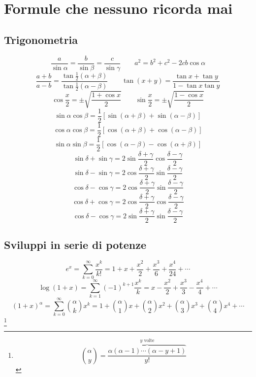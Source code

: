 \chapter{Formule che nessuno ricorda mai}
\section{Trigonometria}
\[\frac{a}{\sin\alpha}=\frac{b}{\sin\beta}=\frac{c}{\sin\gamma}\qquad a^2=b^2+c^2-2cb\cos\alpha\]
\[\frac{a+b}{a-b}=\frac{\tan\frac{1}{2}\left(\alpha+\beta\right)}{\tan\frac{1}{2}\left(\alpha-\beta\right)}\qquad\tan(x+y)=\frac{\tan x+\tan y}{1-\tan x\tan y}\]
\[\cos\frac{x}{2}=\pm\sqrt{\frac{1+\cos x}{2}}\qquad\sin\frac{x}{2}=\pm\sqrt{\frac{1-\cos x}{2}}\]
\[\sin\alpha\cos\beta=\frac{1}{2}\left[\sin\left(\alpha+\beta\right)+\sin\left(\alpha-\beta\right)\right]\]
\[\cos\alpha\cos\beta=\frac{1}{2}\left[\cos\left(\alpha+\beta\right)+\cos\left(\alpha-\beta\right)\right]\]
\[\sin\alpha\sin\beta=\frac{1}{2}\left[\cos\left(\alpha-\beta\right)-\cos\left(\alpha+\beta\right)\right]\]
\[\sin\delta+\sin\gamma=2\sin\frac{\delta+\gamma}{2}\cos\frac{\delta-\gamma}{2}\]
\[\sin\delta-\sin\gamma=2\cos\frac{\delta+\gamma}{2}\sin\frac{\delta-\gamma}{2}\]
\[\cos\delta-\cos\gamma=2\cos\frac{\delta+\gamma}{2}\sin\frac{\delta-\gamma}{2}\]
\[\cos\delta+\cos\gamma=2\cos\frac{\delta+\gamma}{2}\cos\frac{\delta-\gamma}{2}\]
\[\cos\delta-\cos\gamma=2\sin\frac{\delta+\gamma}{2}\sin\frac{\delta-\gamma}{2}\]
\section{Sviluppi in serie di potenze}
\[e^x=\sum_{k=0}^\infty\frac{x^k}{k!}=1+x+\frac{x^2}{2}+\frac{x^3}{6}+\frac{x^4}{24}+\cdots\]
\[\log(1+x)=\sum_{k=1}^{\infty}(-1)^{k+1}\frac{x^k}{k}=x-\frac{x^2}{2}+\frac{x^3}{3}-\frac{x^4}{4}+\cdots\]
\[(1+x)^\alpha=\sum_{k=0}^\infty \binom{\alpha}{k}x^k=1+\binom{\alpha}{1}x+\binom{\alpha}{2}x^2+\binom{\alpha}{3}x^3+\binom{\alpha}{4}x^4+\cdots\]\footnote{\[\binom{\alpha}{y}=\frac{\overbrace{\alpha\left(\alpha-1\right)\cdots\left(\alpha-y+1\right)}^{\text{$y$ volte}}}{y!}\]}